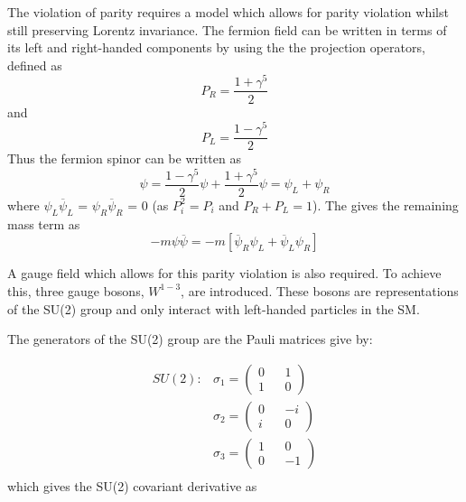 The violation of parity requires a model which allows for parity violation whilst still preserving Lorentz invariance.
The fermion field can be written in terms of its left and right-handed components by using the the projection operators, defined as
\begin{equation}
  P_{R} = \frac{1+\gamma^{5}}{2}
\end{equation}
and
\begin{equation}
  P_{L} = \frac{1-\gamma^{5}}{2}
\end{equation}
Thus the fermion spinor can be written as
\begin{equation}
\psi = \frac{1-\gamma^{5}}{2}\psi + \frac{1+\gamma^{5}}{2}\psi = \psi_{L}+\psi_{R}
\end{equation}
where $\psi_{L}\overline{\psi}_{L}$ = $\psi_{R}\overline{\psi}_{R}$ = 0 (as $P_{i}^{2} = P_{i}$ and $P_{R} + P_{L} = 1$). The gives the remaining mass term as
\begin{equation}
  -m\psi\overline{\psi} = -m[\overline{\psi}_{R}\psi_{L} + \overline{\psi}_{L}\psi_{R}]
\end{equation}


A gauge field which allows for this parity violation is also required.  To achieve this, three gauge bosons, $W^{1-3}$, are introduced.  These bosons are representations of the SU(2) group and only interact with left-handed particles in the SM.

The generators of the SU(2) group are the Pauli matrices give by:

\begin{equation}
  \begin{split}
    SU(2):
    &\sigma_{1} =\begin{pmatrix}0&&1\\1&&0\end{pmatrix}\\
    &\sigma_{2} =\begin{pmatrix}0&&-i\\i&&0\end{pmatrix}\\
    &\sigma_{3} =\begin{pmatrix}1&&0\\0&&-1\end{pmatrix}\\
  \end{split}
\end{equation}
which gives the SU(2) covariant derivative as


